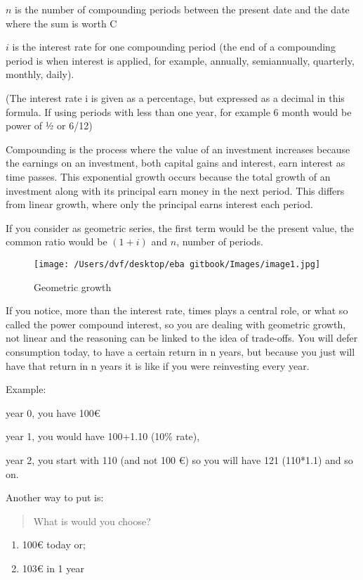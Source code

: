 \documentclass[]{book}
\newcommand{\euro}{€}
\providecommand{\tightlist}{%
  \setlength{\itemsep}{0pt}\setlength{\parskip}{0pt}}
\theoremstyle{definition}
\theoremstyle{definition}
\theoremstyle{definition}
\theoremstyle{remark}
\begin{document}
\(n\) is the number of compounding periods between the present date and
the date where the sum is worth C

\(i\) is the interest rate for one compounding period (the end of a
compounding period is when interest is applied, for example, annually,
semiannually, quarterly, monthly, daily).

(The interest rate i is given as a percentage, but expressed as a
decimal in this formula. If using periods with less than one year, for
example 6 month would be power of ½ or 6/12)

Compounding is the process where the value of an investment increases
because the earnings on an investment, both capital gains and interest,
earn interest as time passes. This exponential growth occurs because the
total growth of an investment along with its principal earn money in the
next period. This differs from linear growth, where only the principal
earns interest each period.

If you consider as geometric series, the first term would be the present
value, the common ratio would be \((1+i)\) and \(n\), number of periods.

\begin{figure}[htbp]
\centering
\texttt{[image: /Users/dvf/desktop/eba gitbook/Images/image1.jpg]}
\caption{Geometric growth}
\end{figure}

If you notice, more than the interest rate, times plays a central role,
or what so called the power compound interest, so you are dealing with
geometric growth, not linear and the reasoning can be linked to the idea
of trade-offs. You will defer consumption today, to have a certain
return in n years, but because you just will have that return in n years
it is like if you were reinvesting every year.

Example:

year 0, you have 100\euro{}

year 1, you would have 100+1.10 (10\% rate),

year 2, you start with 110 (and not 100 \euro{}) so you will have 121
(110*1.1) and so on.

Another way to put is:

\begin{quote}
What is would you choose?
\end{quote}

\begin{enumerate}
\def\labelenumi{\arabic{enumi})}
\tightlist
\item
  100\euro{} today or;
\item
  103\euro{} in 1 year
\end{enumerate}
\end{document}
